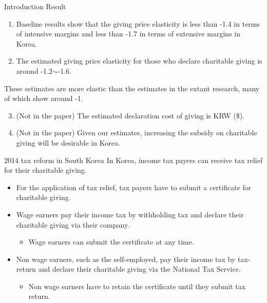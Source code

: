 \documentclass[
  ignorenonframetext,
  aspectratio=169,
]{beamer}
\providecommand{\tightlist}{%
  \setlength{\itemsep}{0pt}\setlength{\parskip}{0pt}}
\begin{document}
\begin{frame}{Introduction}
\protect\hypertarget{introduction-2}{}
Result

\begin{enumerate}
\tightlist
\item
  Baseline results show that the giving price elasticity is less than -1.4 in terms of intensive margins and less than -1.7 in terms of extensive margins in Korea.
\item
  The estimated giving price elasticity for those who declare charitable giving is around -1.2\(\sim\)-1.6.
\end{enumerate}

These estimates are more elastic than the estimates in the extant research, many of which show around -1.

\begin{enumerate}
\setcounter{enumi}{2}
\tightlist
\item
  (Not in the paper) The estimated declaration cost of giving is KRW (\$).
\item
  (Not in the paper) Given our estimates, increasing the subsidy on charitable giving will be desirable in Korea.
\end{enumerate}
\end{frame}

\begin{frame}{2014 tax reform in South Korea}
\protect\hypertarget{tax-reform-in-south-korea}{}
In Korea, income tax payers can receive tax relief for their charitable giving.

\begin{itemize}
\tightlist
\item
  For the application of tax relief, tax payers have to submit a certificate for charitable giving.
\item
  Wage earners pay their income tax by withholding tax and declare their charitable giving via their company.

  \begin{itemize}
  \tightlist
  \item
    Wage earners can submit the certificate at any time.
  \end{itemize}
\item
  Non wage earners, such as the self-employed, pay their income tax by tax-return and declare their charitable giving via the National Tax Service.

  \begin{itemize}
  \tightlist
  \item
    Non wage earners have to retain the certificate until they submit tax return.
  \end{itemize}
\end{itemize}
\end{frame}
\end{document}
